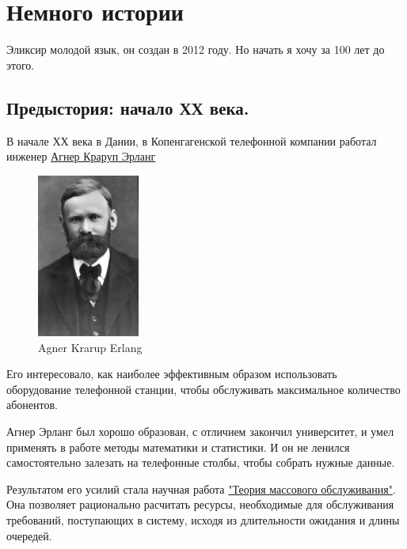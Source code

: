 \chapter{Немного истории}

Эликсир молодой язык, он создан в 2012 году. Но начать я хочу за 100 лет до этого. 

\section{Предыстория: начало ХХ века.}

В начале ХХ века в Дании, в Копенгагенской телефонной компании работал инженер \href{https://ru.wikipedia.org/wiki/%D0%AD%D1%80%D0%BB%D0%B0%D0%BD%D0%B3,_%D0%90%D0%B3%D0%BD%D0%B5%D1%80_%D0%9A%D1%80%D0%B0%D1%80%D1%83%D0%BF}{Агнер Краруп Эрланг}

\begin{figure}[h]
  \centering
  \includegraphics[width=0.3\textwidth]{./lesson_02/img/agner_krarup_erlang.jpg}
  \caption{Agner Krarup Erlang}
\end{figure}

Его интересовало, как наиболее эффективным образом использовать оборудование телефонной станции, чтобы обслуживать максимальное количество абонентов.

Агнер Эрланг был хорошо образован, с отличием закончил университет, и умел применять в работе методы математики и статистики. И он не ленился самостоятельно залезать на телефонные столбы, чтобы собрать нужные данные.

Результатом его усилий стала научная работа \href{https://ru.wikipedia.org/wiki/%D0%A2%D0%B5%D0%BE%D1%80%D0%B8%D1%8F_%D0%BC%D0%B0%D1%81%D1%81%D0%BE%D0%B2%D0%BE%D0%B3%D0%BE_%D0%BE%D0%B1%D1%81%D0%BB%D1%83%D0%B6%D0%B8%D0%B2%D0%B0%D0%BD%D0%B8%D1%8F}{"Теория массового обслуживания"}. Она позволяет рационально расчитать ресурсы, необходимые для обслуживания требований, поступающих в систему, исходя из длительности ожидания и длины очередей.

